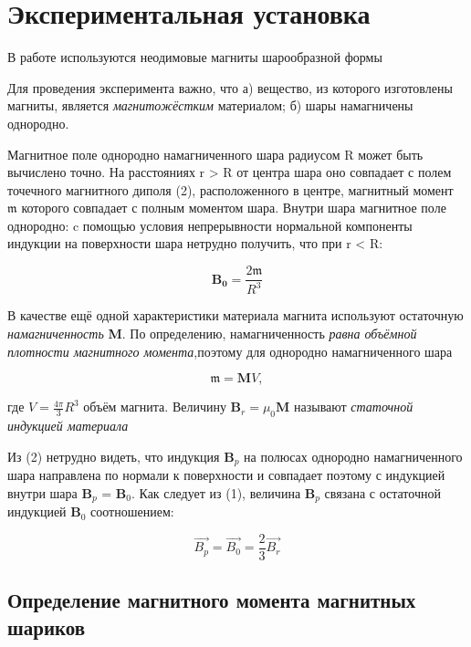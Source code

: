 \documentclass[a4paper,12pt]{article}
\begin{document}
\section{Экспериментальная установка}

В работе используются неодимовые магниты шарообразной формы 

Для проведения эксперимента важно, что а) вещество, из которого
изготовлены магниты, является \textit{магнитожёстким} материалом; б) шары намагничены однородно.  

Магнитное поле однородно намагниченного шара радиусом R может быть вычислено точно. На расстояниях r > R от центра шара оно совпадает с полем точечного магнитного диполя (2), расположенного в центре, магнитный момент $\mathfrak{m}$ которого совпадает с полным моментом шара. Внутри шара магнитное поле однородно: c помощью условия непрерывности нормальной компоненты индукции на поверхности шара нетрудно получить, что при r < R:

\begin{equation}
	\mathbf{B_0} = \dfrac{2 \mathfrak{m}}{R^3}
\end{equation}

В качестве ещё одной характеристики материала магнита используют остаточную \textit{намагниченность} \textbf{M}. По определению, намагниченность \textit{равна объёмной плотности магнитного момента},поэтому для однородно намагниченного шара
	
\begin{equation}
	\mathfrak{m} = \mathbf{M} V,
\end{equation}

где $V = \frac{4\pi}{3} R^3$ объём магнита. Величину $\textbf{B}_r = \mu_0 \textbf{M}$ называют \textit{статочной индукцией материала}

Из (2) нетрудно видеть, что индукция $\textbf{B}_p$ на полюсах однородно намагниченного шара направлена по нормали к поверхности и совпадает
поэтому с индукцией внутри шара $\textbf{B}_p$ = $\textbf{B}_0$. Как следует из (1), величина $\textbf{B}_p$ связана с остаточной индукцией $\textbf{B}_0$ соотношением:

\begin{equation}
	\overrightarrow{B_p} = \overrightarrow{B_0} = \dfrac{2}{3} \overrightarrow{B_r}
\end{equation}

\newpage

\subsection*{Определение магнитного момента магнитных шариков}
\end{document}
